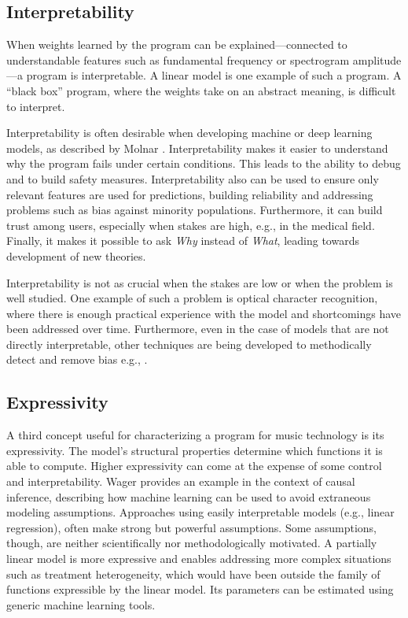 \subsection{Interpretability}
\label{sec:interpretability}
When weights learned by the program can be explained---connected to understandable features such as fundamental frequency or spectrogram amplitude---a program is interpretable. A linear model is one example of such a program. A ``black box'' program, where the weights take on an abstract meaning, is difficult to interpret. 

Interpretability is often desirable when developing machine or deep learning models, as described by Molnar \cite{molnar2020interpretable}. Interpretability makes it easier to understand why the program fails under certain conditions. This leads to the ability to debug and to build safety measures. Interpretability also can be used to ensure only relevant features are used for predictions, building reliability and addressing problems such as bias against minority populations. Furthermore, it can build trust among users, especially when stakes are high, e.g., in the medical field. Finally, it makes it possible to ask \textit{Why} instead of \textit{What}, leading towards development of new theories. 

Interpretability is not as crucial when the stakes are low or when the problem is well studied. One example of such a problem is optical character recognition, where there is enough practical experience with the model and shortcomings have been addressed over time. Furthermore, even in the case of models that are not directly interpretable, other techniques are being developed to methodically detect and remove bias e.g., \cite{jiang2019identifying}.

\subsection{Expressivity}
A third concept useful for characterizing a program for music technology is its expressivity. The model's structural properties determine which functions it is able to compute. Higher expressivity can come at the expense of some control and interpretability. Wager provides an example in the context of causal inference, describing how machine learning can be used to avoid extraneous modeling assumptions. Approaches using easily interpretable models (e.g., linear regression), often make strong but powerful assumptions. Some assumptions, though, are neither scientifically nor methodologically motivated. A partially linear model is more expressive and enables addressing more complex situations such as treatment heterogeneity, which would have been outside the family of functions expressible by the linear model. Its parameters can be estimated using generic machine learning tools. \cite{wager2019causal} 

